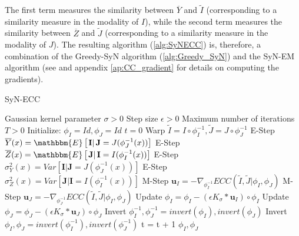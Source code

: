 The first term measures the similarity between $\overline{Y}$ and $\tilde{I}$ (corresponding to a similarity measure in the modality of $I$), while the second term measures the
similarity between $\overline{Z}$ and $\tilde{J}$ (corresponding to a similarity measure in the modality of $J$). The resulting algorithm (\ref{alg:SyNECC})
is, therefore, a combination of the Greedy-SyN algorithm (\ref{alg:Greedy_SyN}) and the SyN-EM algorithm (see \cite{Avants2008} and appendix \ref{ap:CC_gradient} for details on
computing the gradients).

\begin{algorithm}[h!]
\caption{SyN-ECC}\label{alg:SyNECC}
\begin{algorithmic}[1]
\REQUIRE Gaussian kernel parameter $\sigma>0$
\REQUIRE Step size $\epsilon>0$
\REQUIRE Maximum number of iterations $T>0$
\STATE Initialize: $\phi_{I} = Id, \phi_{J} = Id$
\STATE $t=0$
\REPEAT
    \STATE Warp $\tilde{I}  = I \circ \phi_{I}^{-1}, \tilde{J} = J \circ \phi_{J}^{-1}$
    \STATE E-Step $\overline{Y}(x) = \mathbbm{E}\left[\left.\mathbf{I}\right| \mathbf{J}= J(\phi_{J}^{-1}(x))\right]$
    \STATE E-Step $\overline{Z}(x) = \mathbbm{E}\left[\left.\mathbf{J}\right| \mathbf{I}= I(\phi_{I}^{-1}(x))\right]$
    \STATE E-Step $\sigma^{2}_{Y}(x) = Var\left[\left.\mathbf{I}\right| \mathbf{J}= J(\phi_{J}^{-1}(x))\right]$
    \STATE E-Step $\sigma^{2}_{Z}(x) = Var\left[\left.\mathbf{J}\right| \mathbf{I}= I(\phi_{I}^{-1}(x))\right]$
    \STATE M-Step $\mathbf{u}_{I} = - \nabla_{\phi^{-1}_{I}} ECC(\tilde{I}, \tilde{J} | \phi_{I}, \phi_{J})$
    \STATE M-Step $\mathbf{u}_{J} = - \nabla_{\phi^{-1}_{J}} ECC(\tilde{I}, \tilde{J} | \phi_{I}, \phi_{J})$
    \STATE Update $\phi_{I} = \phi_{I} - \left(\epsilon K_{\sigma} \ast \mathbf{u}_{I} \right)\circ \phi_{I}$
    \STATE Update $\phi_{J} = \phi_{J} - \left(\epsilon K_{\sigma} \ast \mathbf{u}_{J} \right)\circ \phi_{J}$
    \STATE Invert $\phi_{I}^{-1}, \phi_{J}^{-1} = invert(\phi_{I}), invert(\phi_{J})$
    \STATE Invert $\phi_{I}, \phi_{J} = invert(\phi_{I}^{-1}), invert(\phi_{J}^{-1})$
    \STATE t = t + 1
\RETURN $\phi_{I}, \phi_{J}$
\end{algorithmic}
\end{algorithm}

